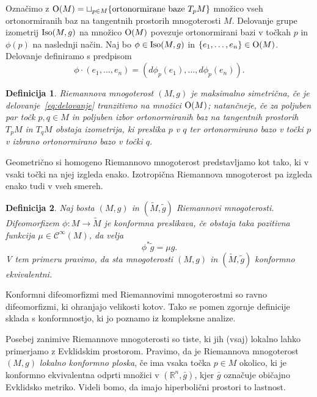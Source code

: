 \documentclass[a4paper]{article}
\newtheorem{definicija}{Definicija}
\begin{document}
Označimo z $\textup{O}(M) = \sqcup_{p \in M} \{ \text{ortonormirane baze} \ T_{p}M \}$ množico vseh ortonormiranih baz na tangentnih prostorih mnogoterosti $M$. Delovanje grupe izometrij $\textup{Iso}(M,g)$ na množico $\textup{O}(M)$ povezuje ortonormirani bazi v točkah $p$ in $\phi(p)$ na naslednji način. Naj bo $\phi \in \textup{Iso}(M,g)$ in $\{e_{1}, \dots , e_{n} \} \in \textup{O}(M)$. Delovanje definiramo s predpisom
\begin{equation}\label{eq:delovanje}
\phi \cdot (e_{1}, \dots , e_{n}) = (d\phi_{p}(e_{1}), \dots , d\phi_{p}(e_{n})).
\end{equation}

\begin{definicija}
Riemannova mnogoterost $(M,g)$ je \emph{maksimalno simetrična}, če je delovanje~\ref{eq:delovanje} tranzitivno na množici $\textup{O}(M)$; natančneje, če za poljuben par točk $p,q \in M$ in poljuben izbor ortonormiranih baz na tangentnih prostorih $T_{p}M$ in $T_{q}M$ obstaja izometrija, ki preslika $p$ v $q$ ter ortonormirano bazo v točki $p$ v izbrano ortonormirano bazo v točki $q$.
\end{definicija}

Geometrično si homogeno Riemannovo mnogoterost predstavljamo kot tako, ki v vsaki točki na njej izgleda enako.
Izotropična Riemannova mnogoterost pa izgleda enako tudi v vseh smereh.

\begin{definicija}
Naj bosta $(M,g)$ in $(\tilde{M}, \tilde{g})$ Riemannovi mnogoterosti. Difeomorfizem $\phi \colon M \to \tilde{M}$ je \emph{konformna preslikava}, če obstaja taka pozitivna funkcija $\mu \in \mathcal{C}^{\infty}(M)$, da velja
\[ \phi^{*}\tilde{g} = \mu g. \]
V tem primeru pravimo, da sta mnogoterosti $(M,g)$ in $(\tilde{M}, \tilde{g})$ \emph{konformno ekvivalentni}.
\end{definicija}

Konformni difeomorfizmi med Riemannovimi mnogoterostmi so ravno difeomorfizmi, ki ohranjajo velikosti kotov. Tako se pomen zgornje definicije sklada s konformnostjo, ki jo poznamo iz kompleksne analize.

Posebej zanimive Riemannove mnogoterosti so tiste, ki jih (vsaj) lokalno lahko primerjamo z Evklidskim prostorom. Pravimo, da je Riemannova mnogoterost $(M,g)$ \emph{lokalno konformno ploska}, če ima vsaka točka $p\in M$ okolico, ki je konformno ekvivalentna odprti množici v $(\mathbb{R}^{n}, \bar{g})$, kjer $\bar{g}$ označuje običajno Evklidsko metriko. Videli bomo, da imajo hiperbolični prostori to lastnost.
\end{document}
